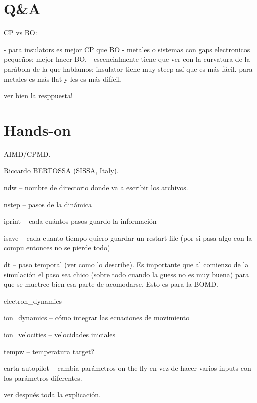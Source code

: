 \section{Q\&A}

CP vs BO:

  - para insulators es mejor CP que BO
  - metales o sistemas con gaps electronicos pequeños: mejor hacer BO.
  - escencialmente tiene que ver con la curvatura de la parábola de la que hablamos: insulator tiene muy steep así que es más fácil. para metales es más flat y les es más difícil.

  ver bien la resppuesta!


\section{Hands-on}

   AIMD/CPMD.

   Riccardo BERTOSSA (SISSA, Italy).

  ndw -- nombre de directorio donde va a escribir los archivos.

  nstep -- pasos de la dinámica

  iprint -- cada cuántos pasos guardo la información

  isave -- cada cuanto tiempo quiero guardar un restart file (por si pasa algo con la compu entonces no se pierde todo)

  dt -- paso temporal (ver como lo describe). Es importante que al comienzo de la simulación el paso sea chico (sobre todo cuando la guess no es muy buena) para que se muetree bien esa parte de acomodarse. Esto es para la BOMD.

  electron\_dynamics --

  ion\_dynamics -- cómo integrar las ecuaciones de movimiento

  ion\_velocities -- velocidades iniciales

  tempw -- temperatura target?

  carta autopilot -- cambia parámetros on-the-fly en vez de hacer varios inputs con los parámetros diferentes.


  ver después toda la explicación.
